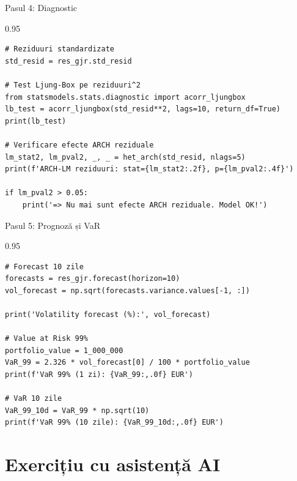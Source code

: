 \documentclass[9pt, aspectratio=169, t]{beamer}
\begin{document}
\begin{frame}[fragile]{Pasul 4: Diagnostic}
    \begin{cminipage}{0.95\textwidth}
\begin{lstlisting}
# Reziduuri standardizate
std_resid = res_gjr.std_resid

# Test Ljung-Box pe reziduuri^2
from statsmodels.stats.diagnostic import acorr_ljungbox
lb_test = acorr_ljungbox(std_resid**2, lags=10, return_df=True)
print(lb_test)

# Verificare efecte ARCH reziduale
lm_stat2, lm_pval2, _, _ = het_arch(std_resid, nlags=5)
print(f'ARCH-LM reziduuri: stat={lm_stat2:.2f}, p={lm_pval2:.4f}')

if lm_pval2 > 0.05:
    print('=> Nu mai sunt efecte ARCH reziduale. Model OK!')
\end{lstlisting}
    \end{cminipage}
\end{frame}

\begin{frame}[fragile]{Pasul 5: Prognoză și VaR}
    \begin{cminipage}{0.95\textwidth}
\begin{lstlisting}
# Forecast 10 zile
forecasts = res_gjr.forecast(horizon=10)
vol_forecast = np.sqrt(forecasts.variance.values[-1, :])

print('Volatility forecast (%):', vol_forecast)

# Value at Risk 99%
portfolio_value = 1_000_000
VaR_99 = 2.326 * vol_forecast[0] / 100 * portfolio_value
print(f'VaR 99% (1 zi): {VaR_99:,.0f} EUR')

# VaR 10 zile
VaR_99_10d = VaR_99 * np.sqrt(10)
print(f'VaR 99% (10 zile): {VaR_99_10d:,.0f} EUR')
\end{lstlisting}
    \end{cminipage}
\end{frame}

\section{Exercițiu cu asistență AI}
\end{document}
